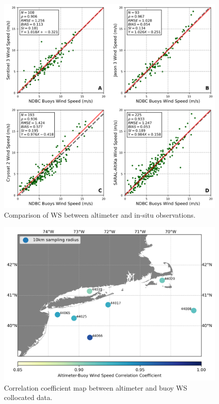 \begin{figure}[H]
\centering
\includegraphics[width=0.79\linewidth]{Figures/Chapter5/validation_altimeters_wind3.png}
\caption{Comparison of WS between altimeter and in-situ observations.}
\label{fig:validation_wind}
\end{figure}


\begin{figure}[H]
\centering
\includegraphics[width=0.79\linewidth]{Figures/Chapter5/buoy_altimeter_cor_coef_wind.png}
\caption{Correlation coefficient map between altimeter and buoy WS collocated data.}
\label{fig:corrcoef_wind}
\end{figure}


